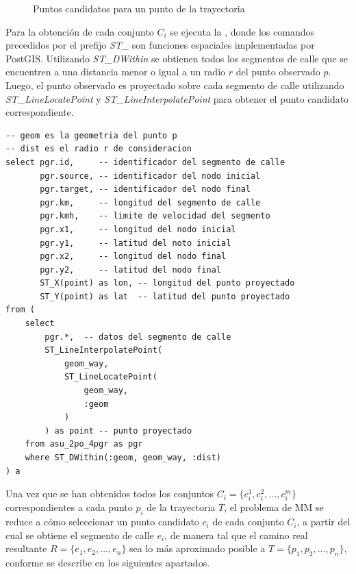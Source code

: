 \begin{figure}[h*]
	\centering
	
	\caption{\label{fig:puntos_candidatos} Puntos candidatos para un punto de la trayectoria}	
\end{figure}

Para la obtención de cada conjunto $C_i$ se ejecuta la , donde los comandos precedidos por el prefijo \emph{ST\_} son funciones espaciales implementadas por PostGIS. Utilizando \emph{ST\_DWithin} se obtienen todos los segmentos de calle que se encuentren a una distancia menor o igual a un radio $r$ del punto observado $p$. Luego, el punto observado es proyectado sobre cada segmento de calle utilizando \emph{ST\_LineLocatePoint} y \emph{ST\_LineInterpolatePoint} para obtener el punto candidato correspondiente.

\begin{lstlisting}[float,floatplacement=!htb,caption={Selección de puntos candidatos}, label={lst:candidatos}]
-- geom es la geometria del punto p
-- dist es el radio r de consideracion
select pgr.id,     -- identificador del segmento de calle 
       pgr.source, -- identificador del nodo inicial
       pgr.target, -- identificador del nodo final
       pgr.km,     -- longitud del segmento de calle
       pgr.kmh,    -- limite de velocidad del segmento
       pgr.x1,     -- longitud del nodo inicial
       pgr.y1,     -- latitud del noto inicial
       pgr.x2,     -- longitud del nodo final
       pgr.y2,     -- latitud del nodo final
       ST_X(point) as lon, -- longitud del punto proyectado
       ST_Y(point) as lat  -- latitud del punto proyectado
from (
    select 
        pgr.*,  -- datos del segmento de calle 
        ST_LineInterpolatePoint(
            geom_way, 
            ST_LineLocatePoint(
                geom_way, 
                :geom
            )
        ) as point -- punto proyectado
    from asu_2po_4pgr as pgr
    where ST_DWithin(:geom, geom_way, :dist)
) a
\end{lstlisting}

Una vez que se han obtenidos todos los conjuntos $C_i = \{c_{i}^{1}, c_{i}^{2}, \dots, c_{i}^{m}\}$ correspondientes a cada punto $p_i$ de la trayectoria $T$, el problema de MM se reduce a cómo seleccionar un punto candidato $c_i$ de cada conjunto $C_i$, a partir del cual se obtiene el segmento de calle $e_i$, de manera tal que el camino real resultante $R = \{ e_1, e_2, \dots, e_n \}$ sea lo más aproximado posible a $T = \{ p_1, p_2, \dots, p_n\}$, conforme se describe en los siguientes apartados.

